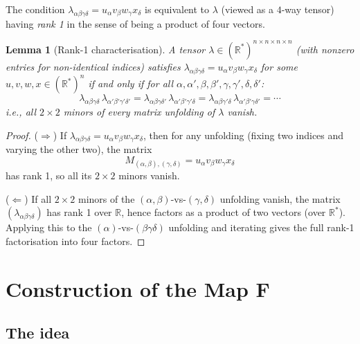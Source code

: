 \documentclass[12pt]{article}
\newtheorem{lemma}[theorem]{Lemma}
\theoremstyle{definition}
\theoremstyle{remark}
\begin{document}
The condition $\lambda_{\alpha\beta\gamma\delta} = u_\alpha v_\beta w_\gamma x_\delta$
is equivalent to $\lambda$ (viewed as a $4$-way tensor) having \emph{rank 1}
in the sense of being a product of four vectors.

\begin{lemma}[Rank-1 characterisation]\label{lem:rank1}
A tensor $\lambda\in(\mathbb{R}^*)^{n\times n\times n\times n}$ (with nonzero
entries for non-identical indices) satisfies
$\lambda_{\alpha\beta\gamma\delta} = u_\alpha v_\beta w_\gamma x_\delta$ for
some $u,v,w,x\in(\mathbb{R}^*)^n$ if and only if for all
$\alpha,\alpha',\beta,\beta',\gamma,\gamma',\delta,\delta'$:
\begin{equation}\label{eq:rank1}
  \lambda_{\alpha\beta\gamma\delta}\,\lambda_{\alpha'\beta'\gamma'\delta'}
  = \lambda_{\alpha\beta\gamma\delta'}\,\lambda_{\alpha'\beta'\gamma'\delta}
  = \lambda_{\alpha\beta\gamma'\delta}\,\lambda_{\alpha'\beta'\gamma\delta'}
  = \cdots
\end{equation}
i.e., all $2\times 2$ minors of every matrix unfolding of $\lambda$ vanish.
\end{lemma}

\begin{proof}
($\Rightarrow$) If $\lambda_{\alpha\beta\gamma\delta}=u_\alpha v_\beta w_\gamma x_\delta$,
then for any unfolding (fixing two indices and varying the other two), the matrix
\[
  M_{(\alpha,\beta),(\gamma,\delta)} = u_\alpha v_\beta w_\gamma x_\delta
\]
has rank 1, so all its $2\times 2$ minors vanish.

($\Leftarrow$) If all $2\times 2$ minors of the $(\alpha,\beta)$-vs-$(\gamma,\delta)$
unfolding vanish, the matrix $(\lambda_{\alpha\beta\gamma\delta})$ has rank 1
over $\mathbb{R}$, hence factors as a product of two vectors (over $\mathbb{R}^*$).
Applying this to the $(\alpha)$-vs-$(\beta\gamma\delta)$ unfolding and iterating
gives the full rank-1 factorisation into four factors.
\end{proof}

\section{Construction of the Map $\mathbf{F}$}

\subsection{The idea}
\end{document}

